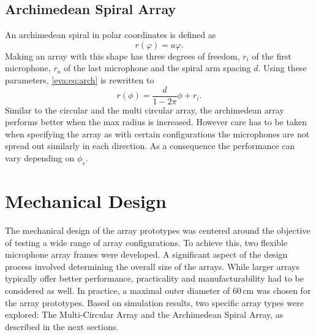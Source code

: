\newpage
\subsection{Archimedean Spiral Array}
An archimedean spiral in polar coordinates is defined as
\begin{equation}
	\label{eva:eq:arch}
	r(\varphi) = a \varphi.
\end{equation}
Making an array with this shape has three degrees of freedom,
$r_i$ of the first microphone, $r_o$ of the last microphone and the 
spiral arm spacing $d$. 
Using these parameters, \eqref{eva:eq:arch} is rewritten to
\begin{equation}
	r(\phi) = \frac{d}{1 - 2\pi} \phi + r_i.
\end{equation}
Similar to the circular and the multi circular array,
the archimedean array performs better when the max 
radius is increased.
However care has to be taken when specifying the array
as with certain configurations the microphones are not 
spread out similarly in each direction.
As a consequence the performance can vary depending 
on $\phi_s$.



\newpage
\section{Mechanical Design}
The mechanical design of the array prototypes was centered around the objective of testing a wide range of array configurations.
To achieve this, two flexible microphone array frames were developed.
A significant aspect of the design process involved determining the overall size of the arrays.
While larger arrays typically offer better performance, practicality and manufacturability had to be considered as well.
In practice, a maximal outer diameter of 60\,cm was chosen for the array prototypes.
Based on simulation results, two specific array types were explored: The Multi-Circular Array and the Archimedean Spiral Array, as described in the next sections.

